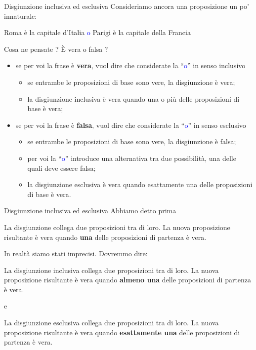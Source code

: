 \documentclass[aspectratio=169,10pt]{beamer}
\newcommand{\conn}[1]{\textcolor{blue}{#1}}
\begin{document}
\begin{frame}{Disgiunzione inclusiva ed esclusiva}
    Consideriamo ancora una proposizione un po' innaturale:
    \begin{example}
    Roma è la capitale d'Italia \conn{o} Parigi è la capitale della Francia
    \end{example}
    Cosa ne pensate ? È vera o falsa ?
    \pause
    \begin{itemize}
    \item se per voi la frase è \textbf{vera}, vuol dire che considerate la ``\conn{o}'' in senso \alert{inclusivo}
    \begin{itemize}
    \item se entrambe le proposizioni di base sono vere, la disgiunzione è vera;
    \item la disgiunzione inclusiva è vera quando \alert{una o più} delle proposizioni di base è vera;
    \end{itemize}
    \pause
    \item se per voi la frase è \textbf{falsa}, vuol dire che considerate la ``\conn{o}'' in  senso \alert{esclusivo}
    \begin{itemize}
        \item se entrambe le proposizioni di base sono vere, la disgiunzione è falsa;
        \item per voi la ``\conn{o}'' introduce una alternativa tra due possibilità, una delle quali deve essere falsa;
        \item la disgiunzione esclusiva è vera quando \alert{esattamente una} delle proposizioni di base è vera.
    \end{itemize}
    \end{itemize}
\end{frame}


\begin{frame}{Disgiunzione inclusiva ed esclusiva}
    Abbiamo detto prima
    \begin{definition}
    La \alert{disgiunzione} collega due proposizioni tra di loro. La nuova proposizione risultante è vera quando \textbf{una} delle proposizioni di partenza è vera.
    \end{definition}
    In realtà siamo stati imprecisi. Dovremmo dire:
        \begin{definition}
            La \alert{disgiunzione inclusiva} collega due proposizioni tra di loro. La nuova proposizione risultante è vera quando \textbf{almeno una} delle proposizioni di partenza è vera.
    \end{definition}
    e
    \begin{definition}
            La \alert{disgiunzione esclusiva} collega due proposizioni tra di loro. La nuova proposizione risultante è vera quando \textbf{esattamente una} delle proposizioni di partenza è vera.
    \end{definition}
\end{frame}
\end{document}
